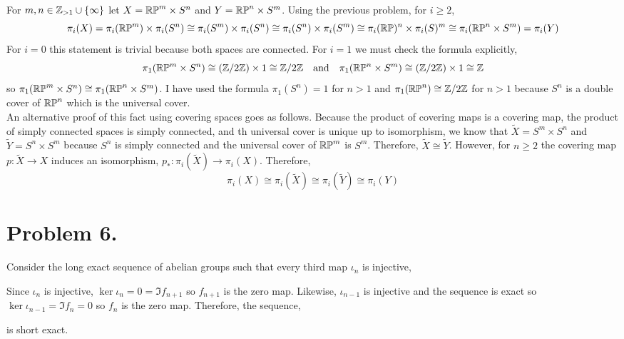 \documentclass[12pt]{extarticle}
\begin{document}
For $m, n \in \mathbb{Z}_{> 1} \cup \{ \infty \}$ let $X = \mathbb{RP}^m \times S^n$ and $Y = \mathbb{RP}^n \times S^m$. Using the previous problem, for $ i \ge 2$,
\[ \pi_i(X) = \pi_i(\mathbb{RP}^m) \times \pi_i(S^n) \cong \pi_i(S^m) \times \pi_i(S^n) \cong \pi_i(S^n) \times \pi_i(S^m)  \cong \pi_i(\mathbb{RP})^n \times \pi_i(S)^m \cong \pi_i(\mathbb{RP}^n \times S^m) = \pi_i(Y) \]
For $i = 0$ this statement is trivial because both spaces are connected. For $i = 1$ we must check the formula explicitly,
\[ \pi_1(\mathbb{RP}^m \times S^n) \cong (\mathbb{Z} / 2 \mathbb{Z}) \times 1 \cong \mathbb{Z} / 2 \mathbb{Z} \quad \text{and} \quad \pi_1(\mathbb{RP}^n \times S^m) \cong (\mathbb{Z}/2 \mathbb{Z}) \times 1 \cong \mathbb{Z}\]
so $\pi_1(\mathbb{RP}^m \times S^n) \cong \pi_1(\mathbb{RP}^n \times S^m)$. I have used the formula $\pi_1(S^n) = 1$ for $n > 1$ and $\pi_1(\mathbb{RP}^n) \cong \mathbb{Z} / 2 \mathbb{Z}$ for $n > 1$ because $S^n$ is a double cover of $\mathbb{RP}^n$ which is the universal cover. \bigskip\\
An alternative proof of this fact using covering spaces goes as follows. Because the product of covering maps is a covering map, the product of simply connected spaces is simply connected, and th universal cover is unique up to isomorphism, we know that $\tilde{X} = S^m \times S^n$ and $\tilde{Y} = S^n \times S^m$ because $S^n$ is simply connected and the universal cover of $\mathbb{RP}^m$ is $S^m$. Therefore, $\tilde{X} \cong \tilde{Y}$. However, for $n \ge 2$ the covering map $p : \tilde{X} \to X$ induces an isomorphism, $p_* : \pi_i(\tilde{X}) \to \pi_i(X)$. Therefore,
\[ \pi_i(X) \cong \pi_i(\tilde{X}) \cong \pi_i(\tilde{Y}) \cong \pi_i(Y) \]

\section*{Problem 6.}

Consider the long exact sequence of abelian groups such that every third map $\iota_n$ is injective,
\begin{center}
\end{center}
Since $\iota_n$ is injective, $\ker{\iota_n} = 0 = \Im{f_{n+1}}$ so $f_{n+1}$ is the zero map. Likewise, $\iota_{n-1}$ is injective and the sequence is exact so $\ker{\iota_{n - 1}} = \Im{f_n} = 0$ so $f_n$ is the zero map. Therefore, the sequence,  
\begin{center}
\end{center}
is short exact.
\end{document}
